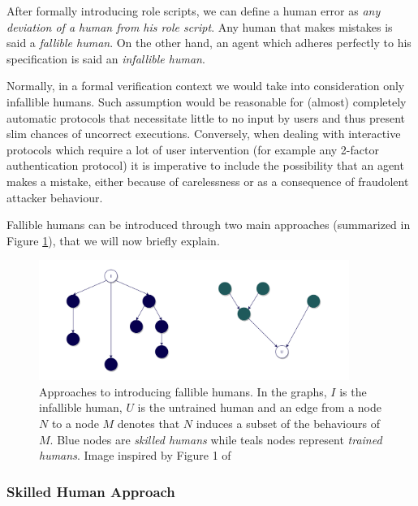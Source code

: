 \documentclass{article}
\begin{document}
After formally introducing role scripts, we can define a human error as \textit{any deviation of a human from his role script}. Any human that makes mistakes is said a \textit{fallible human}. On the other hand, an agent which adheres perfectly to his specification is said an \textit{infallible human}.

Normally, in a formal verification context we would take into consideration only infallible humans. Such assumption would be reasonable for (almost) completely automatic protocols that necessitate little to no input by users and thus present slim chances of uncorrect executions. Conversely, when dealing with interactive protocols which require a lot of user intervention (for example any 2-factor authentication protocol) it is imperative to include the possibility that an agent makes a mistake, either because of carelessness or as a consequence of fraudolent attacker behaviour.

Fallible humans can be introduced through two main approaches (summarized in Figure \ref{fig:fallible_humans}), that we will now briefly explain.

\begin{figure}[htbp]
    \centering
    \includegraphics[width=0.9\textwidth]{images/falliblehumans.png}
    \caption{Approaches to introducing fallible humans. In the graphs, $I$ is the infallible human, $U$ is the untrained human and an edge from a node $N$ to a node $M$ denotes that $N$ induces a subset of the behaviours of $M$. Blue nodes are \textit{skilled humans} while teals nodes represent \textit{trained humans}. Image inspired by Figure 1 of \cite{Basin_2016}}
    \label{fig:fallible_humans}
\end{figure}

\subsubsection{Skilled Human Approach}
\end{document}
